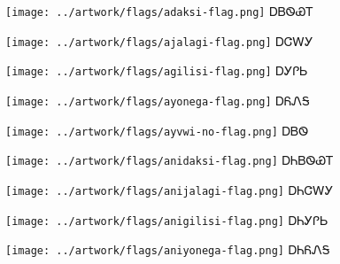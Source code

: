 \documentclass[avery5371,frame]{flashcards}%
\begin{document}

\begin{flashcard}{
\texttt{[image: ../artwork/flags/adaksi-flag.png]}
}\Huge ᎠᏴᏫᏯᎢ
\end{flashcard}

\begin{flashcard}{
\texttt{[image: ../artwork/flags/ajalagi-flag.png]}
}\Huge ᎠᏣᎳᎩ
\end{flashcard}

\begin{flashcard}{
\texttt{[image: ../artwork/flags/agilisi-flag.png]}
}\Huge ᎠᎩᎵᏏ
\end{flashcard}

\begin{flashcard}{
\texttt{[image: ../artwork/flags/ayonega-flag.png]}
}\Huge ᎠᏲᏁᎦ
\end{flashcard}

\begin{flashcard}{
\texttt{[image: ../artwork/flags/ayvwi-no-flag.png]}
}\Huge ᎠᏴᏫ
\end{flashcard}


\begin{flashcard}{
\texttt{[image: ../artwork/flags/anidaksi-flag.png]}
}\Huge ᎠᏂᏴᏫᏯᎢ
\end{flashcard}

\begin{flashcard}{
\texttt{[image: ../artwork/flags/anijalagi-flag.png]}
}\Huge ᎠᏂᏣᎳᎩ
\end{flashcard}

\begin{flashcard}{
\texttt{[image: ../artwork/flags/anigilisi-flag.png]}
}\Huge ᎠᏂᎩᎵᏏ
\end{flashcard}

\begin{flashcard}{
\texttt{[image: ../artwork/flags/aniyonega-flag.png]}
}\Huge ᎠᏂᏲᏁᎦ
\end{flashcard}
\end{document}
